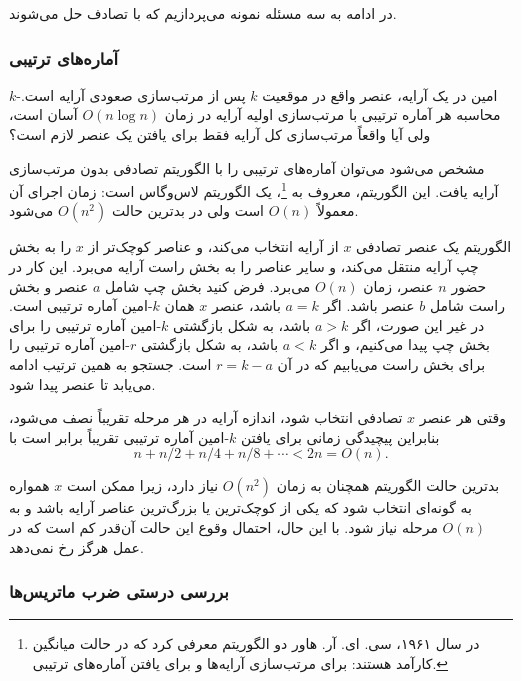 در ادامه به سه مسئله نمونه می‌پردازیم که
با تصادف حل می‌شوند.

\subsubsection{آماره‌های ترتیبی}


$k$-امین  در یک آرایه،
عنصر واقع در موقعیت $k$ پس از مرتب‌سازی
صعودی آرایه است.
محاسبه هر آماره ترتیبی با مرتب‌سازی اولیه آرایه
در زمان $O(n \log n)$ آسان است،
ولی آیا واقعاً مرتب‌سازی کل آرایه
فقط برای یافتن یک عنصر لازم است؟

مشخص می‌شود می‌توان آماره‌های ترتیبی را
با الگوریتم تصادفی بدون مرتب‌سازی آرایه یافت.
این الگوریتم، معروف به \footnote{در سال ۱۹۶۱،
سی. ای. آر. هاور دو الگوریتم معرفی کرد که
در حالت میانگین کارآمد هستند:  
 \cite{hoa61a} برای مرتب‌سازی آرایه‌ها و
 \cite{hoa61b} برای یافتن آماره‌های ترتیبی.}، یک الگوریتم لاس‌وگاس است:
زمان اجرای آن معمولاً $O(n)$ است
ولی در بدترین حالت $O(n^2)$ می‌شود.

الگوریتم یک عنصر تصادفی $x$
از آرایه انتخاب می‌کند، و عناصر کوچک‌تر از $x$ را
به بخش چپ آرایه منتقل می‌کند،
و سایر عناصر را به بخش راست آرایه می‌برد.
این کار در حضور $n$ عنصر، زمان $O(n)$ می‌برد.
فرض کنید بخش چپ شامل $a$ عنصر
و بخش راست شامل $b$ عنصر باشد.
اگر $a=k$ باشد، عنصر $x$ همان $k$-امین آماره ترتیبی است.
در غیر این صورت، اگر $a>k$ باشد، به شکل بازگشتی $k$-امین آماره
ترتیبی را برای بخش چپ پیدا می‌کنیم،
و اگر $a<k$ باشد، به شکل بازگشتی $r$-امین آماره
ترتیبی را برای بخش راست می‌یابیم که در آن $r=k-a$ است.
جستجو به همین ترتیب ادامه می‌یابد تا عنصر
پیدا شود.

وقتی هر عنصر $x$ تصادفی انتخاب شود،
اندازه آرایه در هر مرحله تقریباً نصف می‌شود،
بنابراین پیچیدگی زمانی برای
یافتن $k$-امین آماره ترتیبی تقریباً برابر است با
\[n+n/2+n/4+n/8+\cdots < 2n = O(n).\]

بدترین حالت الگوریتم همچنان به زمان $O(n^2)$ نیاز دارد،
زیرا ممکن است $x$ همواره به گونه‌ای انتخاب شود
که یکی از کوچک‌ترین یا بزرگ‌ترین عناصر آرایه باشد
و به $O(n)$ مرحله نیاز شود.
با این حال، احتمال وقوع این حالت آن‌قدر کم است
که در عمل هرگز رخ نمی‌دهد.

\subsubsection{بررسی درستی ضرب ماتریس‌ها}


